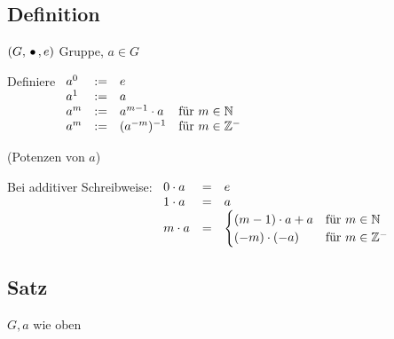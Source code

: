 \subsection[Definition: Potenzen]{Definition}

$(G, \,{\bullet}\,, e)$ Gruppe, $a \in G$

Definiere
$\begin{array}[t]{lcll}
a^0	&:=& e \\
a^1 &:=& a \\
a^m &:=& a^{m-1} \cdot a & \text{für } m \in \mathbb{N} \\
a^m &:=& (a^{-m})^{-1} 	& \text{für } m \in \mathbb{Z}^-
\end{array}$

(Potenzen von $a$)

Bei additiver Schreibweise:
$\begin{array}[t]{lcl}
0 \cdot a &=& e \\
1 \cdot a &=& a \\
m \cdot a &=& 
\begin{cases}
(m-1) \cdot a + a & \text{für } m \in \mathbb{N} \\
(-m) \cdot (-a) 	& \text{für } m \in \mathbb{Z}^-
\end{cases}
\end{array}$

\subsection[Satz: Potenzgesetze]{Satz}
\label{potenzgesetze}
$G, a$ wie oben

